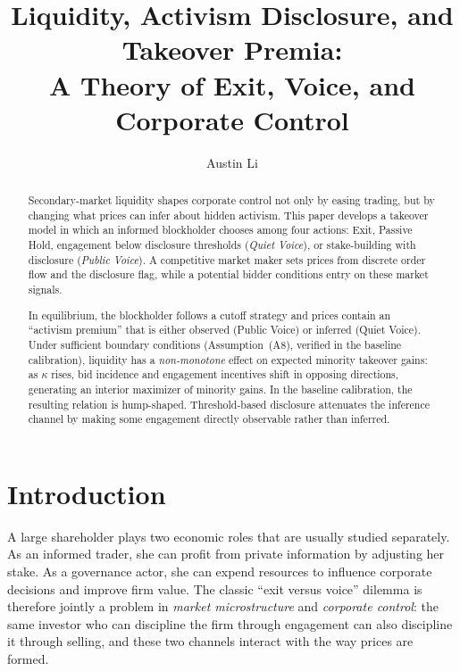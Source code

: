 \documentclass[11pt]{article}
\title{\textbf{Liquidity, Activism Disclosure, and Takeover Premia:}\\[0.3em]
\large A Theory of Exit, Voice, and Corporate Control}
\author{Austin Li\\[0.25em]}
\date{}
\newcommand{\1}{\mathbf{1}}
\begin{document}
\maketitle

\begin{abstract}
\noindent Secondary-market liquidity shapes corporate control not only by easing trading, but by changing what prices can infer about hidden activism. This paper develops a takeover model in which an informed blockholder chooses among four actions: Exit, Passive Hold, engagement below disclosure thresholds (\emph{Quiet Voice}), or stake-building with disclosure (\emph{Public Voice}). A competitive market maker sets prices from discrete order flow and the disclosure flag, while a potential bidder conditions entry on these market signals.

In equilibrium, the blockholder follows a cutoff strategy and prices contain an ``activism premium'' that is either observed (Public Voice) or inferred (Quiet Voice). Under sufficient boundary conditions (Assumption~\textup{(A8)}, verified in the baseline calibration), liquidity has a \emph{non-monotone} effect on expected minority takeover gains: as $\kappa$ rises, bid incidence and engagement incentives shift in opposing directions, generating an interior maximizer of minority gains. In the baseline calibration, the resulting relation is hump-shaped. Threshold-based disclosure attenuates the inference channel by making some engagement directly observable rather than inferred.

\end{abstract}

\newpage

\section{Introduction}

A large shareholder plays two economic roles that are usually studied separately. As an informed trader, she can profit from private information by adjusting her stake. As a governance actor, she can expend resources to influence corporate decisions and improve firm value. The classic ``exit versus voice'' dilemma \citep{Hirschman1970} is therefore jointly a problem in \emph{market microstructure} and \emph{corporate control}: the same investor who can discipline the firm through engagement can also discipline it through selling, and these two channels interact with the way prices are formed.
\end{document}

